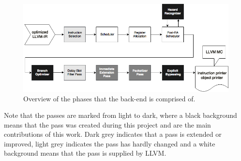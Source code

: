 \begin{figure}[H]
\centering
\hspace*{-.12in}
\includegraphics[width=\textwidth]{figures/code_generation}
\caption{Overview of the phases that the back-end is comprised of.}
\label{fig:simd_backend}
\end{figure}

Note that the passes are marked from light to dark, where a black background means that the pass was created during this project and are the main contributions of this work. Dark grey indicates that a pass is extended or improved, light grey indicates the pass has hardly changed and a white background means that the pass is supplied by LLVM.

